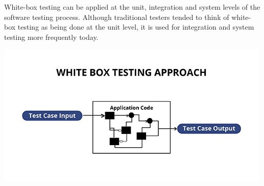 White-box testing can be applied at the unit, integration and system levels of the software testing process. Although traditional testers tended to think of white-box testing as being done at the unit level, it is used for integration and system testing more frequently today.

\begin{center}
	\includegraphics[scale=0.7]{images/Capture1}
\end{center}

\clearpage